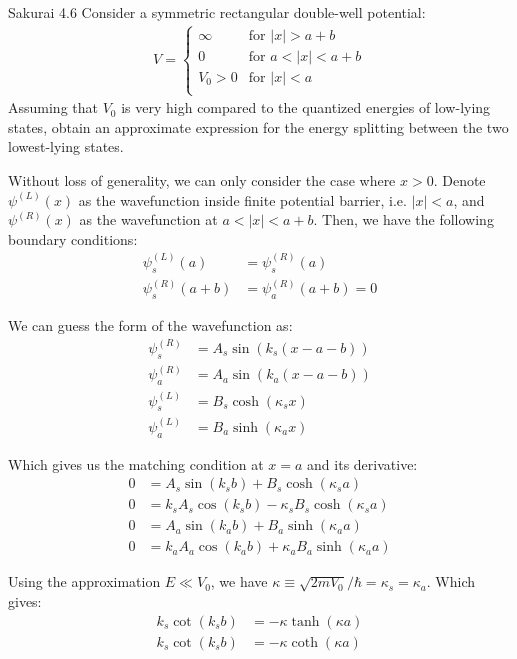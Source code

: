 \documentclass{article}
\begin{document}
\newpage
\begin{section}{Sakurai 4.6}
Consider a symmetric rectangular double-well potential:
\begin{align*}
	V = \begin{cases}
		    ∞      & \text{for $|x| > a+b$} \\
		    0      & \text{for $a < |x| < a+b$} \\
		    V_0 >0 & \text{for $|x| < a$} \\
	    \end{cases}
\end{align*}
Assuming that $V_0$ is very high compared to the quantized energies of low-lying states, obtain an approximate expression for the energy splitting between the two lowest-lying states.

\begin{tcolorbox}[breakable]
	Without loss of generality, we can only consider the case where $x > 0$. Denote $ψ^{(L)}(x)$ as the wavefunction inside finite potential barrier, i.e. $|x| < a$, and $ψ^{(R)}(x)$ as the wavefunction at $a < |x| < a+b$. Then, we have the following boundary conditions:
	\begin{align*}
		\psi^{(L)}_s(a) &= \psi^{(R)}_s(a) \\
		\psi^{(R)}_s(a+b) &= \psi^{(R)}_a(a+b) = 0
	\end{align*}

	We can guess the form of the wavefunction as:
	\begin{align*}
		ψ_s^{(R)} &= A_s \sin (k_s(x-a-b)) \\
		ψ_a^{(R)} &= A_a \sin (k_a(x-a-b)) \\
		ψ_s^{(L)} &= B_s \cosh (κ_s x) \\
		ψ_a^{(L)} &= B_a \sinh (κ_a x)
	\end{align*}

	Which gives us the matching condition at $x = a$ and its derivative:
	\begin{align*}
		0 &= A_s \sin (k_s b) + B_s \cosh (κ_s a) \\
		0 &= k_sA_s \cos (k_s b) - κ_s B_s \cosh (κ_s a) \\
		0 &= A_a \sin (k_a b) + B_a \sinh (κ_a a) \\
		0 &= k_aA_a \cos (k_a b) + κ_a B_a \sinh (κ_a a) 
	\end{align*}

	Using the approximation $E ≪ V_0$, we have $κ ≡ \sqrt{2mV_0}/\hbar = κ_s = κ_a$. Which gives:
	\begin{align*}
		k_s \cot (k_s b) &= -κ \tanh (κ a) \\
		k_s \cot (k_s b) &= -κ \coth (κ a) 
	\end{align*}


\end{tcolorbox}
\end{section}
\end{document}
